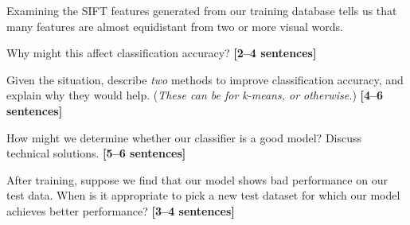 \documentclass{csci1430}
\begin{document}
Examining the SIFT features generated from our training database tells us that many features are almost equidistant from two or more visual words.

\begin{subquestion}[points=1]
Why might this affect classification accuracy? \textbf{[2--4 sentences]}
\end{subquestion}
    
\begin{answer}[height=6]

\end{answer}
    

\begin{subquestion}[points=2]
Given the situation, describe \emph{two} methods to improve classification accuracy, and explain why they would help. (\emph{These can be for k-means, or otherwise.}) \textbf{[4--6 sentences]}
\end{subquestion}
    
\begin{answer}[height=12]

\end{answer}
    

\pagebreak
\begin{subquestion}[points=4]
How might we determine whether our classifier is a good model? Discuss technical solutions. \textbf{[5--6 sentences]}
\end{subquestion}

\begin{answer}[height=12]

\end{answer}

\begin{subquestion}[points=2]
After training, suppose we find that our model shows bad performance on our test data. When is it appropriate to pick a new test dataset for which our model achieves better performance? \textbf{[3--4 sentences]}
\end{subquestion}

\begin{answer}[height=12]

\end{answer}
\end{document}
